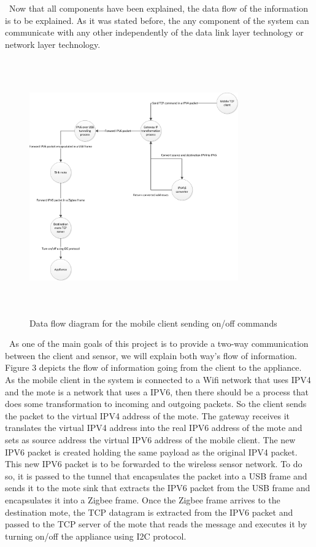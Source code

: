 \documentclass[conference]{IEEEtran}
\begin{document}
\ Now that all components have been explained, the data flow of the information is to be explained. As it was stated before, the any component of the system can communicate with any other independently of the data link layer technology or network layer technology.

\begin{figure}[htbp]
\centering
\includegraphics[height=110mm,width=90mm]{images/control_appliance_data_flow.jpg}
\caption{Data flow diagram for the mobile client sending on/off commands}
\label{fig:control_appliance}
\end{figure}

\
As one of the main goals of this project is to provide a two-way communication between the client and sensor, we will explain both way's flow of information. Figure 3 depicts the flow of information going from the client to the appliance. As the mobile client in the system is connected to a Wifi network that uses IPV4 and the mote is a network that uses a IPV6, then there should be a process that does some transformation to incoming and outgoing packets. So the client sends the packet to the virtual IPV4 address of the mote. The gateway receives it translates the virtual IPV4 address into the real IPV6 address of the mote and sets as source address the virtual IPV6 address of the mobile client. The new IPV6 packet is created holding the same payload as the original IPV4 packet. This new IPV6 packet is to be forwarded to the wireless sensor network. To do so, it is passed to the tunnel that encapsulates the packet into a USB frame and sends it to the mote sink that extracts the IPV6 packet from the USB frame and encapsulates it into a Zigbee frame. Once the Zigbee frame arrives to the destination mote, the TCP datagram is extracted from the IPV6 packet and passed to the TCP server of the mote that reads the message and executes it by turning on/off the appliance using I2C protocol.
\end{document}
